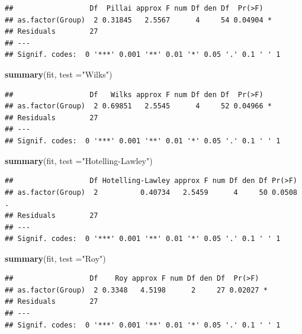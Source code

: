 \documentclass[
]{book}
\newenvironment{Shaded}{\begin{snugshade}}{\end{snugshade}}
\newcommand{\DataTypeTok}[1]{\textcolor[rgb]{0.13,0.29,0.53}{#1}}
\newcommand{\KeywordTok}[1]{\textcolor[rgb]{0.13,0.29,0.53}{\textbf{#1}}}
\newcommand{\NormalTok}[1]{#1}
\newcommand{\StringTok}[1]{\textcolor[rgb]{0.31,0.60,0.02}{#1}}
\begin{document}
\begin{verbatim}
##                  Df  Pillai approx F num Df den Df  Pr(>F)  
## as.factor(Group)  2 0.31845   2.5567      4     54 0.04904 *
## Residuals        27                                         
## ---
## Signif. codes:  0 '***' 0.001 '**' 0.01 '*' 0.05 '.' 0.1 ' ' 1
\end{verbatim}

\begin{Shaded}
\begin{Highlighting}[]
\KeywordTok{summary}\NormalTok{(fit, }\DataTypeTok{test =}\StringTok{"Wilks"}\NormalTok{)}
\end{Highlighting}
\end{Shaded}

\begin{verbatim}
##                  Df   Wilks approx F num Df den Df  Pr(>F)  
## as.factor(Group)  2 0.69851   2.5545      4     52 0.04966 *
## Residuals        27                                         
## ---
## Signif. codes:  0 '***' 0.001 '**' 0.01 '*' 0.05 '.' 0.1 ' ' 1
\end{verbatim}

\begin{Shaded}
\begin{Highlighting}[]
\KeywordTok{summary}\NormalTok{(fit, }\DataTypeTok{test =}\StringTok{"Hotelling-Lawley"}\NormalTok{)}
\end{Highlighting}
\end{Shaded}

\begin{verbatim}
##                  Df Hotelling-Lawley approx F num Df den Df Pr(>F)  
## as.factor(Group)  2          0.40734   2.5459      4     50 0.0508 .
## Residuals        27                                                 
## ---
## Signif. codes:  0 '***' 0.001 '**' 0.01 '*' 0.05 '.' 0.1 ' ' 1
\end{verbatim}

\begin{Shaded}
\begin{Highlighting}[]
\KeywordTok{summary}\NormalTok{(fit, }\DataTypeTok{test =}\StringTok{"Roy"}\NormalTok{)}
\end{Highlighting}
\end{Shaded}

\begin{verbatim}
##                  Df    Roy approx F num Df den Df  Pr(>F)  
## as.factor(Group)  2 0.3348   4.5198      2     27 0.02027 *
## Residuals        27                                        
## ---
## Signif. codes:  0 '***' 0.001 '**' 0.01 '*' 0.05 '.' 0.1 ' ' 1
\end{verbatim}
\end{document}
